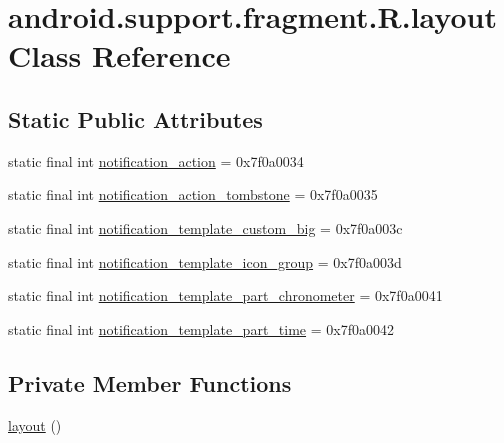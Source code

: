 \hypertarget{classandroid_1_1support_1_1fragment_1_1_r_1_1layout}{}\section{android.\+support.\+fragment.\+R.\+layout Class Reference}
\label{classandroid_1_1support_1_1fragment_1_1_r_1_1layout}
\subsection*{Static Public Attributes}
\begin{DoxyCompactItemize}
\item 
static final int \mbox{\hyperlink{classandroid_1_1support_1_1fragment_1_1_r_1_1layout_a791e08fcdc9e05bf963845223d181b0c}{notification\+\_\+action}} = 0x7f0a0034
\item 
static final int \mbox{\hyperlink{classandroid_1_1support_1_1fragment_1_1_r_1_1layout_a7d7b44c89af4927392573ce34e0ea1c9}{notification\+\_\+action\+\_\+tombstone}} = 0x7f0a0035
\item 
static final int \mbox{\hyperlink{classandroid_1_1support_1_1fragment_1_1_r_1_1layout_a13f474722b247fdd643e2d8604afd5aa}{notification\+\_\+template\+\_\+custom\+\_\+big}} = 0x7f0a003c
\item 
static final int \mbox{\hyperlink{classandroid_1_1support_1_1fragment_1_1_r_1_1layout_ae5a01afc8b1457fcb8e7ca7cb5b12ad6}{notification\+\_\+template\+\_\+icon\+\_\+group}} = 0x7f0a003d
\item 
static final int \mbox{\hyperlink{classandroid_1_1support_1_1fragment_1_1_r_1_1layout_a9d448ba0d8e460da8ea06572ca6f0816}{notification\+\_\+template\+\_\+part\+\_\+chronometer}} = 0x7f0a0041
\item 
static final int \mbox{\hyperlink{classandroid_1_1support_1_1fragment_1_1_r_1_1layout_ad29861bef0147e4d35f5e9b0575e5ed5}{notification\+\_\+template\+\_\+part\+\_\+time}} = 0x7f0a0042
\end{DoxyCompactItemize}
\subsection*{Private Member Functions}
\begin{DoxyCompactItemize}
\item 
\mbox{\hyperlink{classandroid_1_1support_1_1fragment_1_1_r_1_1layout_a35a1f390f9606563a5a61424f9bfc36d}{layout}} ()
\end{DoxyCompactItemize}


